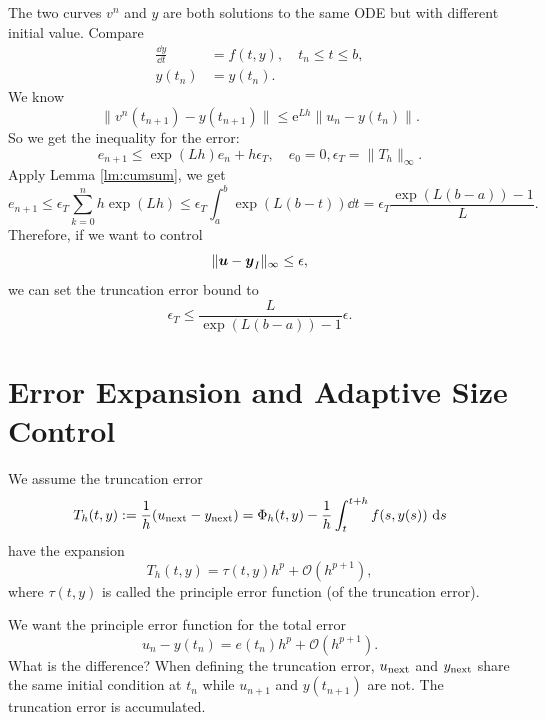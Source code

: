 \documentclass[10pt]{amsart}
\begin{document}
The two curves $v^n$ and $y$ are both solutions to the same ODE but with different initial value. Compare 
\begin{equation}
\begin{aligned}
\frac{\dd y}{\dd t} &= f(t, y), \quad t_n \leq t \leq b, \\
y(t_n) &= y(t_n).
\end{aligned}
\end{equation}
We know
$$
\|v^n(t_{n+1}) - y(t_{n+1})\| \leq \mathrm{e}^{Lh}\left\|u_n - y(t_n)\right\|.
$$
So we get the inequality for the error:
$$
e_{n+1}\leq \exp(Lh) e_n + h \epsilon_T,  \quad e_0 = 0, \epsilon_T = \|T_h\|_{\infty}.
$$
Apply Lemma \ref{lm:cumsum}, we get
$$
e_{n+1}\leq \epsilon_T \sum_{k=0}^n h \exp(Lh)\leq \epsilon_T \int_a^b \exp (L(b-t))\dd t = \epsilon_T \frac{ \exp (L(b-a))-1}{L}.
$$
Therefore, if we want to control 
$$
\| \boldsymbol u - \boldsymbol y_I\|_{\infty} \leq \epsilon,
$$
we can set the truncation error bound to 
\begin{equation}
 \epsilon_T \leq \frac{L}{ \exp (L(b-a))-1} \epsilon.
\end{equation}



\section{Error Expansion and Adaptive Size Control}
We assume the truncation error
\begin{equation}\label{eq:Tphi}  
T_h(t, y) := \frac{1}{h}(u_{\rm next} - y_{\rm next}) =  \Phi_h(t, y) - \frac{1}{h} \int_{t}^{t+h} f(s, y(s)) \, \,{\rm d} s
\end{equation}  
have the expansion
$$
T_h(t, y) = \tau(t, y) h^p + \mathcal O(h^{p+1}),
$$
where $\tau(t,y)$ is called the principle error function (of the truncation error). 

We want the principle error function for the total error
$$
u_n - y(t_n) = e(t_n) h^p + \mathcal O(h^{p+1}).
$$
What is the difference? When defining the truncation error, $u_{\rm next}$ and $y_{\rm next}$ share the same initial condition at $t_n$ while $u_{n+1}$ and $y(t_{n+1})$ are not. The truncation error is accumulated. 
\end{document}

